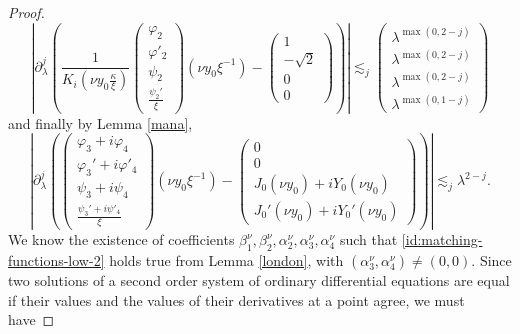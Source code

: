 \documentclass[11 pt]{amsart}
\theoremstyle{definition}
\theoremstyle{remark}
\numberwithin{equation}{section}
\begin{document}
\begin{proof}
  \begin{equation} \label{somebodyscream-11}  \left| \partial_{\lambda}^j \left( \frac{1}{K_i \left( \nu y_0
     \frac{\kappa}{\xi} \right)} \left(\begin{array}{c}
       \varphi_2\\
       \varphi'_2\\
       \psi_2\\
       \frac{\psi_2'}{\xi}
     \end{array}\right) (\nu y_0 \xi^{- 1}) - \left(\begin{array}{c}
       1\\
       - \sqrt{2}\\
       0\\
       0
     \end{array}\right) \right) \right| \lesssim_j \left(\begin{array}{c}
       \lambda^{\max (0, 2 - j)}\\
       \lambda^{\max (0, 2 - j)}\\
       \lambda^{\max (0, 2 - j)}\\
       \lambda^{\max (0, 1 - j)}
     \end{array}\right) 
     \end{equation}
  and finally by Lemma \ref{mana},
  \begin{equation} \label{somebodyscream-12} \left| \partial_{\lambda}^j \left( \left(\begin{array}{c}
       \varphi_3 + i \varphi_4\\
       \varphi_3' + i \varphi'_4\\
       \psi_3 + i \psi_4\\
       \frac{\psi_3' + i \psi'_4}{\xi}
     \end{array}\right) (\nu y_0 \xi^{- 1}) - \left(\begin{array}{c}
       0\\
       0\\
       J_0 (\nu y_0) + i Y_0 (\nu y_0)\\
       J_0' (\nu y_0) + i Y_0' (\nu y_0)
     \end{array}\right) \right) \right| \lesssim_j \lambda^{2 - j} .
     \end{equation}
  We know the existence of coefficients $\beta^{\nu}_1, \beta^{\nu}_2, \alpha^{\nu}_2,
  \alpha^{\nu}_3, \alpha^{\nu}_4$ such that \eqref{id:matching-functions-low-2} holds true from Lemma \ref{london}, with $(\alpha^{\nu}_3,
  \alpha^{\nu}_4)\neq (0,0)$. Since two solutions of a second order system of ordinary differential equations are equal if their values and the values of their derivatives at a point agree, we must have

\end{proof}
\end{document}
